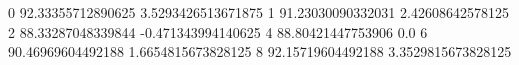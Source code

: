 0 92.33355712890625 3.5293426513671875
1 91.23030090332031 2.42608642578125
2 88.33287048339844 -0.471343994140625
4 88.80421447753906 0.0
6 90.46969604492188 1.6654815673828125
8 92.15719604492188 3.3529815673828125
